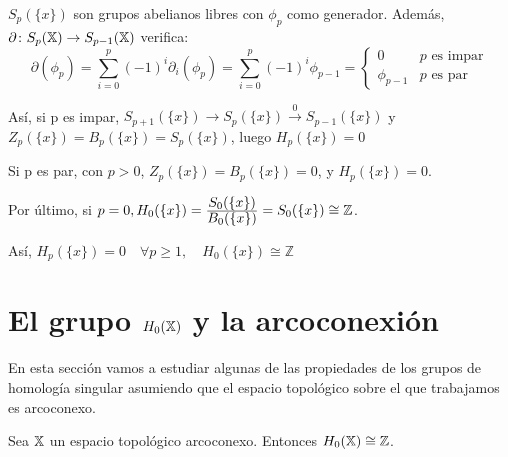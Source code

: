 $S_p({\{x\}})$ son grupos abelianos libres con $\phi_p$ como generador. Además, $\partial \colon S_{p}({\mathbb X}) \to S_{p-1}({\mathbb X})$ verifica:
\[\partial(\phi_p) = \sum_{i = 0}^p (-1)^i \partial_i(\phi_p) =  \sum_{i = 0}^p (-1)^i \phi_{p-1} = \begin{cases}
                                                                                                            0 & p \text{ es impar} \\
                                                                                                            \phi_{p-1} & p \text{ es par}
                                                                                                    \end{cases}   \]

Así, si p es impar, $S_{p+1}(\{x\}) \to S_p(\{x\}) \xrightarrow{0} S_{p-1}(\{x\})$ y $Z_p(\{x\}) = B_p(\{x\}) = S_p(\{x\})$, luego
$H_p(\{x\}) = 0$

Si p es par, con $p > 0$, $Z_p(\{x\}) = B_p(\{x\}) = 0$, y $H_p(\{x\}) = 0$.

Por último, si $ p = 0, H_0(\{x\}) = \frac{\displaystyle S_0(\{x\})}{\displaystyle B_0(\{x\})} = S_0(\{x\}) \cong \mathbb Z$.

Así, $H_p(\{x\}) = 0 \hspace{1em} \forall p \geq 1, \hspace{1em} H_0(\{x\}) \cong \mathbb Z$

\section{El grupo $H_0({\mathbb X})$ y la arcoconexión}

En esta sección vamos a estudiar algunas de las propiedades de los grupos de homología singular asumiendo que el espacio topológico
sobre el que trabajamos es arcoconexo.

\begin{proposition}
  Sea ${\mathbb X}$ un espacio topológico arcoconexo. Entonces $H_0({\mathbb X}) \cong \mathbb Z$.
\end{proposition}

